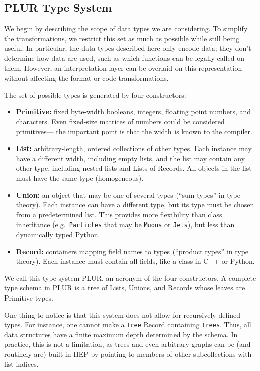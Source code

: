 \documentclass[10pt, conference, compsocconf]{IEEEtran}
\begin{document}
\subsection{PLUR Type System}
\label{type-system}

We begin by describing the scope of data types we are considering. To simplify the transformations, we restrict this set as much as possible while still being useful. In particular, the data types described here only encode data; they don't determine how data are used, such as which functions can be legally called on them. However, an interpretation layer can be overlaid on this representation without affecting the format or code transformations.

The set of possible types is generated by four constructors:
\begin{itemize}
\item {\bf Primitive:} fixed byte-width booleans, integers, floating point numbers, and characters. Even fixed-size matrices of numbers could be considered primitives--- the important point is that the width is known to the compiler.
\item {\bf List:} arbitrary-length, ordered collections of other types. Each instance may have a different width, including empty lists, and the list may contain any other type, including nested lists and Lists of Records. All objects in the list must have the same type (homogeneous).
\item {\bf Union:} an object that may be one of several types (``sum types'' in type theory). Each instance can have a different type, but its type must be chosen from a predetermined list. This provides more flexibility than class inheritance (e.g.\ {\tt Particles} that may be {\tt Muons} or {\tt Jets}), but less than dynamically typed Python.
\item {\bf Record:} containers mapping field names to types (``product types'' in type theory). Each instance must contain all fields, like a class in C++ or Python.
\end{itemize}
We call this type system PLUR, an acronym of the four constructors. A complete type schema in PLUR is a tree of Lists, Unions, and Records whose leaves are Primitive types.

One thing to notice is that this system does not allow for recursively defined types. For instance, one cannot make a {\tt Tree} Record containing {\tt Trees}. Thus, all data structures have a finite maximum depth determined by the schema. In practice, this is not a limitation, as trees and even arbitrary graphs can be (and routinely are) built in HEP by pointing to members of other subcollections with list indices.
\end{document}
